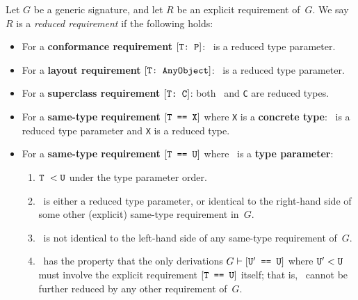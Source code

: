\documentclass[../generics]{subfiles}
\begin{document}
\begin{definition}\label{reduced requirement}
Let $G$ be a generic signature, and let $R$ be an explicit requirement of~$G$. We say $R$ is a \emph{reduced requirement} if the following holds:
\begin{itemize}
\item For a \textbf{conformance requirement} $[\texttt{T:~P}]$: \tT\ is a reduced type parameter.
\item For a \textbf{layout requirement} $[\texttt{T:~AnyObject}]$: \tT\ is a reduced type parameter.
\item For a \textbf{superclass requirement} $[\texttt{T:~C}]$: both \tT\ and \texttt{C} are reduced types.
\item For a \textbf{same-type requirement} $[\texttt{T == X}]$ where \texttt{X} is a \textbf{concrete type}: \tT\ is a reduced type parameter and \texttt{X} is a reduced type.
\item For a \textbf{same-type requirement} $[\texttt{T == U}]$ where \tU\ is a \textbf{type parameter}:
\begin{enumerate}
\item $\texttt{T}\ < \texttt{U}$ under the type parameter order.
\item \tT\ is either a reduced type parameter, or identical to the right-hand side of some other (explicit) same-type requirement in~$G$.
\item \tT\ is not identical to the left-hand side of any same-type requirement of~$G$.
\item \tU\ has the property that the only derivations $G\vdash[\texttt{$\texttt{U}^\prime$ == U}]$ where $\texttt{U}^\prime<\texttt{U}$ must involve the explicit requirement $[\texttt{T == U}]$ itself; that is, \tU\ cannot be further reduced by any other requirement of~$G$.
\end{enumerate}
\end{itemize}
\end{definition}
\end{document}
